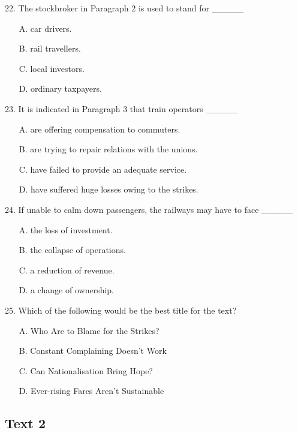 \documentclass[UTF8,11pt]{ctexart}
\begin{document}
22. The stockbroker in Paragraph 2 is used to stand for \_\_\_\_\_


\begin{itemize}[leftmargin=2em,itemsep=.2em,topsep=.4em]\item[A.] car drivers.
\item[B.] rail travellers.
\item[C.] local investors.
\item[D.] ordinary taxpayers.
\end{itemize}

23. It is indicated in Paragraph 3 that train operators \_\_\_\_\_


\begin{itemize}[leftmargin=2em,itemsep=.2em,topsep=.4em]\item[A.] are offering compensation to commuters.
\item[B.] are trying to repair relations with the unions.
\item[C.] have failed to provide an adequate service.
\item[D.] have suffered huge losses owing to the strikes.
\end{itemize}

24. If unable to calm down passengers, the railways may have to face \_\_\_\_\_


\begin{itemize}[leftmargin=2em,itemsep=.2em,topsep=.4em]\item[A.] the loss of investment.
\item[B.] the collapse of operations.
\item[C.] a reduction of revenue.
\item[D.] a change of ownership.
\end{itemize}

25. Which of the following would be the best title for the text?


\begin{itemize}[leftmargin=2em,itemsep=.2em,topsep=.4em]\item[A.] Who Are to Blame for the Strikes?
\item[B.] Constant Complaining Doesn’t Work
\item[C.] Can Nationalisation Bring Hope?
\item[D.] Ever-rising Fares Aren’t Sustainable
\end{itemize}

\subsection*{\textbf{Text 2}}
\end{document}
